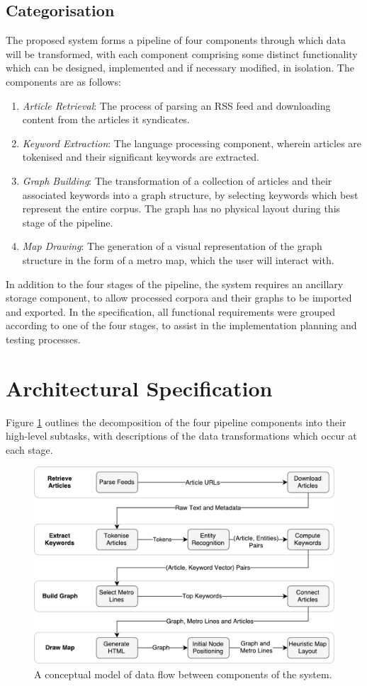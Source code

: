 \subsection{Categorisation}
The proposed system forms a pipeline of four components through which data will be transformed, with each component comprising some distinct functionality which can be designed, implemented and if necessary modified, in isolation. The components are as follows:
\begin{enumerate}[itemsep=0.1em]
	\item \textit{Article Retrieval}: The process of parsing an RSS feed and downloading content from the articles it syndicates.
	\item \textit{Keyword Extraction}: The language processing component, wherein articles are tokenised and their significant keywords are extracted.
	\item \textit{Graph Building}: The transformation of a collection of articles and their associated keywords into a graph structure, by selecting keywords which best represent the entire corpus. The graph has no physical layout during this stage of the pipeline.
	\item \textit{Map Drawing}: The generation of a visual representation of the graph structure in the form of a metro map, which the user will interact with.
\end{enumerate}
In addition to the four stages of the pipeline, the system requires an ancillary storage component, to allow processed corpora and their graphs to be imported and exported. In the specification, all functional requirements were grouped according to one of the four stages, to assist in the implementation planning and testing processes.

\section{Architectural Specification}
Figure \ref{fig:dfp} outlines the decomposition of the four pipeline components into their high-level subtasks, with descriptions of the data transformations which occur at each stage.

\begin{figure}[htbp!]
	\centering
	\includegraphics[width=\textwidth]{img/design/DataFlow.pdf}
	\caption{A conceptual model of data flow between components of the system.}
	\label{fig:dfp}
\end{figure}

